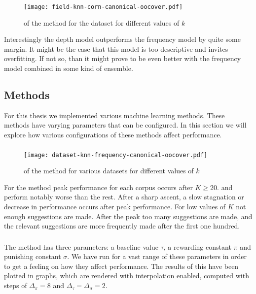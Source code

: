 \begin{figure}[H]
  \centerline{\texttt{[image: field-knn-corn-canonical-oocover.pdf]}}
  \caption{\oocover of the \knn method for the \corn dataset for different values of $k$}
\end{figure}

Interestingly the depth model outperforms the frequency model by quite some margin.
It might be the case that this model is too descriptive and invites overfitting.
If not so, than it might prove to be even better with the frequency model combined in some kind of ensemble.

\subsection{Methods}
For this thesis we implemented various machine learning methods.
These methods have varying parameters that can be configured.
In this section we will explore how various configurations of these methods affect performance.

\subsubsection{\knn}
\begin{figure}[H]
  \centerline{\texttt{[image: dataset-knn-frequency-canonical-oocover.pdf]}}
  \caption{\oocover of the \knn method for various datasets for different values of $k$}
\end{figure}

For the \knn method peak \oocover performance for each corpus occurs after $K\geq20$.
\corn and \mathclasses perform notably worse than the rest.
After a sharp ascent, a slow stagnation or decrease in performance occurs after peak performance.
For low values of $K$ not enough suggestions are made.
After the peak too many suggestions are made, and the relevant suggestions are more frequently made after the first one hundred.

\subsubsection{\nb}
The \nb method has three parameters: a baseline value $\tau$, a rewarding constant $\pi$ and punishing constant $\sigma$.
We have run \nb for a vast range of these parameters in order to get a feeling on how they affect performance.
The results of this have been plotted in graphs, which are rendered with interpolation enabled,
computed with steps of $\Delta_\pi = 8$ and $\Delta_\tau = \Delta_\sigma = 2$.

